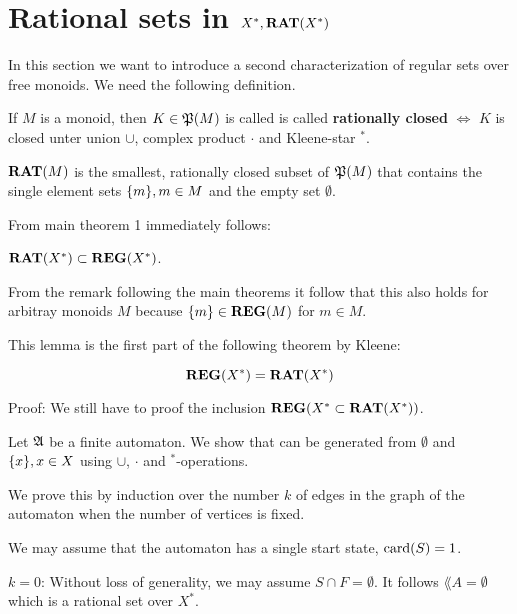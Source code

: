 \section{Rational sets in $X^*, \mbox{{\bf RAT}}(X^*)$}

In this section we want to introduce a second characterization of regular sets
over free monoids. We need the following definition.

\begin{definition}
If $M$ is a monoid, then $K \in \mathfrak{P}(M)$ is called is called {\bf rationally
closed} $\Leftrightarrow$ $K$ is closed unter union $\cup$, complex product $\cdot$ and Kleene-star $^*$.
\end{definition}

\begin{definition}
$\mbox{{\bf RAT}}(M)$ is the smallest, rationally closed subset of $\mathfrak{P}(M)$ that
contains the single element sets $\mbox{$\{m\}$}, m \in M$ and the empty set
$\emptyset$.
\end{definition}

From main theorem 1 immediately follows:

\begin{lemma}
$\mbox{{\bf RAT}}(X^*) \subset \mbox{{\bf REG}}(X^*)$.
\end{lemma}

From the remark following the main theorems it follow that this also holds for
arbitray monoids $M$ because $\mbox{$\{m\}$} \in \mbox{{\bf REG}}(M)$ for $m \in M$.

This lemma is the first part of the following theorem by Kleene:

\begin{theorem}[Kleene]
\[ \mbox{{\bf REG}}(X^*) = \mbox{{\bf RAT}}(X^*) \]
\end{theorem}

Proof: We still have to proof the inclusion $\mbox{{\bf REG}}(X^* \subset \mbox{{\bf RAT}}(X^*))$.

Let $\mbox{$\mathfrak{A}$}$ be a finite automaton. We show that  can be generated
from $\emptyset$ and $\mbox{$\{x\}$}, x \in X$	using $\cup$, $\cdot$ and
$^*$-operations.

We prove this by induction over the number $k$ of edges in the graph of the
automaton when the number of vertices is fixed.

We may assume that the automaton has a single start state, $\mathrm{card}(S) = 1$.

$k = 0$: Without loss of generality, we may assume $S \cap F = \emptyset$. It
follows $\lang{A} = \emptyset$ which is a rational set over $X^*$.

